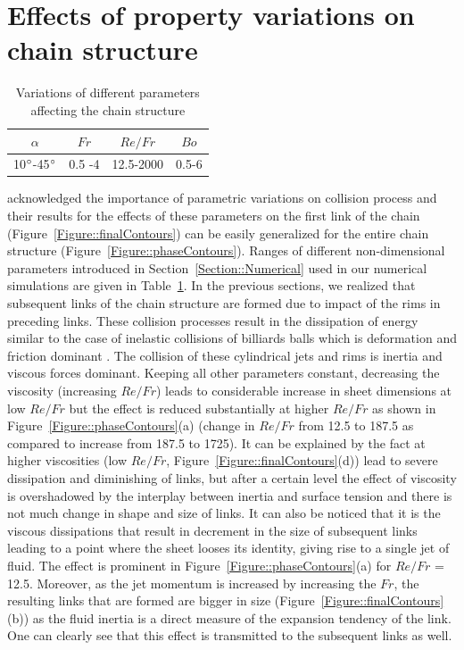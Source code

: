 \documentclass[%
aip,
sd,%
amsmath,amssymb,
preprint,%
author-year,%
]{revtex4-1}
\begin{document}
\section{Effects of property variations on chain structure} \label{Section::ParametricVariations}
\begin{table}[]
	\centering
	\caption{Variations of different parameters affecting the chain structure}
	\label{Table::parameters}
	\begin{tabular}{@{}cccc@{}}
		\hline
		$\alpha$ & $Fr$     & $Re/Fr$     & $Bo$    \\ \hline
		10$\degree$-45$\degree$ & 0.5 -4 & 12.5-2000 & 0.5-6 \\ \hline
	\end{tabular}
\end{table}
\cite{yang2014liquid} acknowledged the importance of parametric variations on collision process and their results for the effects of these parameters on the first link of the chain (Figure~\ref{Figure::finalContours}) can be easily generalized for the entire chain structure (Figure~\ref{Figure::phaseContours}). Ranges of different non-dimensional parameters introduced in Section~\ref{Section::Numerical} used in our numerical simulations are given in Table~\ref{Table::parameters}. In the previous sections, we realized that subsequent links of the chain structure are formed due to impact of the rims in preceding links. These collision processes result in the dissipation of energy similar to the case of inelastic collisions of billiards balls which is deformation and friction dominant \citep{irodov1980fundamental}. The collision of these cylindrical jets and rims is inertia and viscous forces dominant. Keeping all other parameters constant, decreasing the viscosity (increasing $Re/Fr$) leads to considerable increase in sheet dimensions at low $Re/Fr$ but the effect is reduced substantially at higher $Re/Fr$ as shown in Figure~\ref{Figure::phaseContours}(a) (change in $Re/Fr$ from 12.5 to 187.5 as compared to increase from 187.5 to 1725). It can be explained by the fact at higher viscosities (low $Re/Fr$, Figure~\ref{Figure::finalContours}(d)) lead to severe dissipation and diminishing of links, but after a certain level the effect of viscosity is overshadowed by the interplay between inertia and surface tension and there is not much change in shape and size of links. It can also be noticed that it is the viscous dissipations that result in decrement in the size of subsequent links leading to a point where the sheet looses its identity, giving rise to a single jet of fluid. The effect is prominent in Figure~\ref{Figure::phaseContours}(a) for $Re/Fr$ = 12.5. Moreover, as the jet momentum is increased by increasing the $Fr$, the resulting links that are formed are bigger in size (Figure~\ref{Figure::finalContours}(b)) as the fluid inertia is a direct measure of the expansion tendency of the link. One can clearly see that this effect is transmitted to the subsequent links as well.\\
\end{document}
